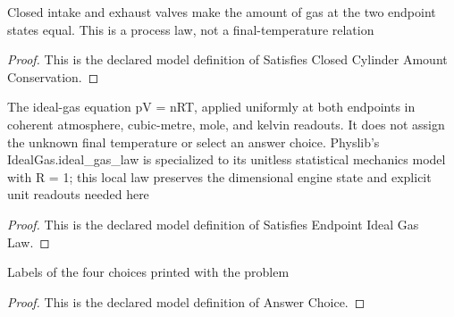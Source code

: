 \begin{definition}
  \label{def:physics:phyx-mini-0469:phyxminiproblems-problemphyxmini0469-satisfiesclosedcylinderamountconservation}
  Closed intake and exhaust valves make the amount of gas at the two endpoint states equal. This is a process law, not a final-temperature relation
\end{definition}
\begin{proof}
  This is the declared model definition of Satisfies Closed Cylinder Amount Conservation.
\end{proof}
\begin{definition}
  \label{def:physics:phyx-mini-0469:phyxminiproblems-problemphyxmini0469-satisfiesendpointidealgaslaw}
  The ideal-gas equation pV = nRT, applied uniformly at both endpoints in coherent atmosphere, cubic-metre, mole, and kelvin readouts. It does not assign the unknown final temperature or select an answer choice. Physlib's IdealGas.ideal\_gas\_law is specialized to its unitless statistical mechanics model with R = 1; this local law preserves the dimensional engine state and explicit unit readouts needed here
\end{definition}
\begin{proof}
  This is the declared model definition of Satisfies Endpoint Ideal Gas Law.
\end{proof}
\begin{definition}
  \label{def:physics:phyx-mini-0469:phyxminiproblems-problemphyxmini0469-answerchoice}
  Labels of the four choices printed with the problem
\end{definition}
\begin{proof}
  This is the declared model definition of Answer Choice.
\end{proof}
